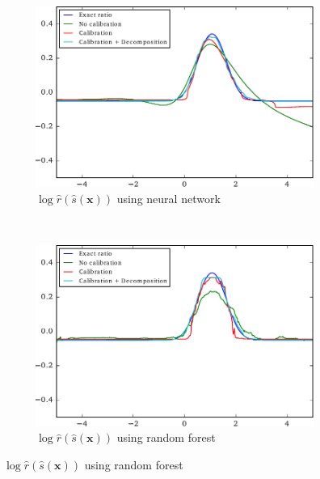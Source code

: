 \documentclass[12pt]{article}
\numberwithin{equation}{section}
\theoremstyle{plain}
\begin{document}
\begin{figure}
    \vspace{1em}

    \begin{subfigure}[b]{0.4\textwidth}
        \includegraphics[width=\textwidth]{figures/fig1c.pdf}
        \caption{$\log \hat r(\hat{s}(\mathbf{x}))$ using neural network}
        \label{fig:1c}
    \end{subfigure}
    ~
    \begin{subfigure}[b]{0.4\textwidth}
        \includegraphics[width=\textwidth]{figures/fig1d.pdf}
        \caption{$\log \hat r(\hat{s}(\mathbf{x}))$ using random forest}
        \label{fig:1d}
    \end{subfigure}

    \vspace{1em}


\end{figure}
\end{document}
